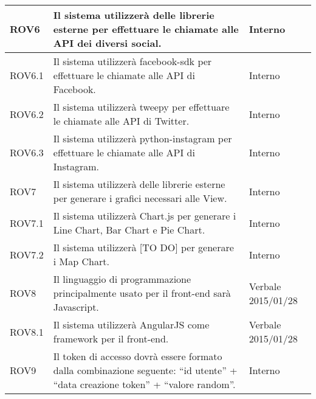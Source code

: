 \begin{center}
\begin{longtable}{| p{2.5cm} | p{8cm} | p{2cm} |}
		ROV6  &  Il sistema utilizzerà delle librerie esterne per effettuare le chiamate alle API dei diversi social.  &  Interno \\
		\hline
		ROV6.1  &  Il sistema utilizzerà facebook-sdk per effettuare le chiamate alle API di Facebook.  &  Interno \\
		\hline
		ROV6.2  &  Il sistema utilizzerà tweepy per effettuare le chiamate alle API di Twitter.  &  Interno \\
		\hline
		ROV6.3  &  Il sistema utilizzerà python-instagram per effettuare le chiamate alle API di Instagram.  &  Interno \\
		\hline

		ROV7  &  Il sistema utilizzerà delle librerie esterne per generare i grafici necessari alle View.  &  Interno \\
		\hline
		ROV7.1  &  Il sistema utilizzerà Chart.js per generare i Line Chart, Bar Chart e Pie Chart.  &  Interno \\
		\hline
		ROV7.2  &  Il sistema utilizzerà [TO DO] per generare i Map Chart.  &  Interno \\
		\hline

		ROV8  &  Il linguaggio di programmazione principalmente usato per il front-end sarà Javascript.  &  Verbale 2015/01/28 \\
		\hline
		ROV8.1  &  Il sistema utilizzerà AngularJS come framework per il front-end.  &  Verbale 2015/01/28 \\
		\hline


		ROV9  &  Il token di accesso dovrà essere formato dalla combinazione seguente: ``id utente'' + ``data creazione token'' + ``valore random''.  &  Interno \\
		\hline

	\end{longtable}
	\egroup
\end{center}

